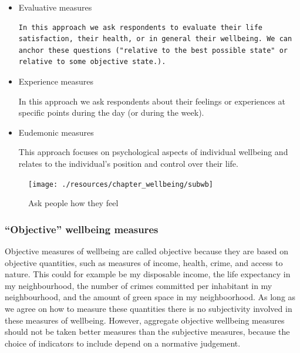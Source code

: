 \documentclass[
]{book}
\begin{document}
\begin{itemize}
\item
  Evaluative measures

\begin{verbatim}
In this approach we ask respondents to evaluate their life satisfaction, their health, or in general their wellbeing. We can anchor these questions ("relative to the best possible state" or relative to some objective state.).
\end{verbatim}
\item
  Experience measures

  In this approach we ask respondents about their feelings or experiences at specific points during the day (or during the week).
\item
  Eudemonic measures

  This approach focuses on psychological aspects of individual wellbeing and relates to the individual's position and control over their life.
\end{itemize}

\begin{figure}

{\centering \texttt{[image: ./resources/chapter\_wellbeing/subwb]} 

}

\caption{Ask people how they feel}\label{fig:wfig2}
\end{figure}

\hypertarget{objective-wellbeing-measures}{%
\subsubsection*{``Objective'' wellbeing measures}\label{objective-wellbeing-measures}}

Objective measures of wellbeing are called objective because they are based on objective quantities, such as measures of income, health, crime, and access to nature. This could for example be my disposable income, the life expectancy in my neighbourhood, the number of crimes committed per inhabitant in my neighbourhood, and the amount of green space in my neighboorhood. As long as we agree on how to measure these quantities there is no subjectivity involved in these measures of wellbeing. However, aggregate objective wellbeing measures should not be taken better measures than the subjective measures, because the choice of indicators to include depend on a normative judgement.
\end{document}
